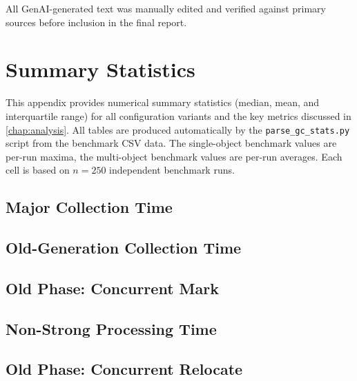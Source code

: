 All \ac{GenAI}-generated text was manually edited and verified against primary sources before inclusion in the final report.

\chapter{Summary Statistics}
\label{app:stats}

This appendix provides numerical summary statistics (median, mean, and interquartile range) for all configuration variants and the key metrics discussed in \cref{chap:analysis}. All tables are produced automatically by the \texttt{parse\_gc\_stats.py} script from the benchmark CSV data. The single-object benchmark values are per-run maxima, the multi-object benchmark values are per-run averages. Each cell is based on $n = 250$ independent benchmark runs.

\section{Major Collection Time}
\label{app:stats-major}



\section{Old-Generation Collection Time}
\label{app:stats-oldgen}



\section{Old Phase: Concurrent Mark}
\label{app:stats-old-mark}



\section{Non-Strong Processing Time}
\label{app:stats-nonstrong}



\section{Old Phase: Concurrent Relocate}
\label{app:stats-old-relocate}


